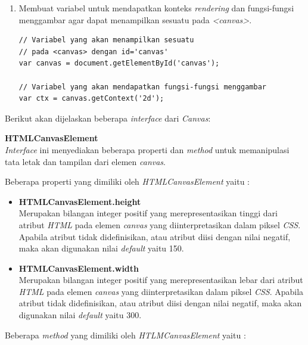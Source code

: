 \documentclass[a4paper,twoside]{article}
\begin{document}
\begin{enumerate}
\begin{enumerate}
\begin{enumerate}
				\item Membuat variabel untuk mendapatkan konteks \textit{rendering} dan fungsi-fungsi menggambar agar dapat menampilkan sesuatu pada \textit{<canvas>}.
\begin{lstlisting}
// Variabel yang akan menampilkan sesuatu 
// pada <canvas> dengan id='canvas'
var canvas = document.getElementById('canvas'); 
				
// Variabel yang akan mendapatkan fungsi-fungsi menggambar 
var ctx = canvas.getContext('2d');
\end{lstlisting}
			\end{enumerate}
			
			Berikut akan dijelaskan beberapa \textit{interface} dari \textit{Canvas}:
			
			\textbf{HTMLCanvasElement} \\
			\textit{Interface} ini menyediakan beberapa properti dan \textit{method} untuk memanipulasi tata letak dan tampilan dari elemen \textit{canvas}.
			
			Beberapa properti yang dimiliki oleh \textit{HTMLCanvasElement} yaitu : 
			
			\begin{itemize}
				\item \textbf{HTMLCanvasElement.height} \\ Merupakan bilangan integer positif yang merepresentasikan tinggi dari atribut \textit{HTML} pada elemen \textit{canvas} yang diinterpretasikan dalam piksel \textit{CSS}. Apabila atribut tidak didefinisikan, atau atribut diisi dengan nilai negatif, maka akan digunakan nilai \textit{default} yaitu 150.
				
				\item \textbf{HTMLCanvasElement.width} \\ Merupakan bilangan integer positif yang merepresentasikan lebar dari atribut \textit{HTML} pada elemen \textit{canvas} yang diinterpretasikan dalam piksel \textit{CSS}. Apabila atribut tidak didefinisikan, atau atribut diisi dengan nilai negatif, maka akan digunakan nilai \textit{default} yaitu 300.
			\end{itemize}
			
			Beberapa \textit{method} yang dimiliki oleh \textit{HTLMCanvasElement} yaitu : 
			

\end{enumerate}
\end{enumerate}
\end{document}
